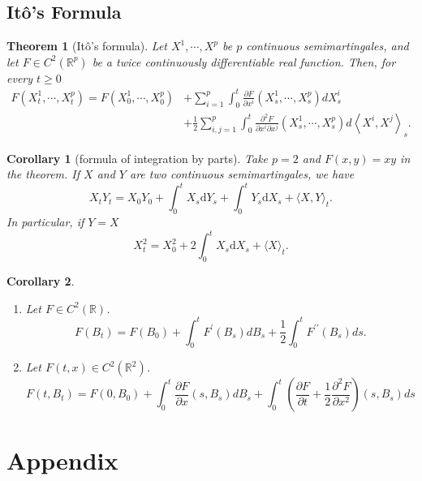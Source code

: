 \documentclass{report}
\newtheorem{corollary}{Corollary}[section]
\newtheorem{theorem}{Theorem}[section]
\theoremstyle{nonumberplain}
\begin{document}
\section{Itô's Formula}
\begin{theorem}[Itô's formula]
	Let $X^{1}, \cdots, X^{p}$ be $p$ continuous semimartingales, and let $F\in C^2(\mathbb{R}^{p})$ be a twice continuously differentiable real function. Then, for every $t \geq 0$
	\[
	\begin{aligned}
	F\left(X_{t}^{1}, \cdots, X_{t}^{p}\right)=F\left(X_{0}^{1}, \cdots, X_{0}^{p}\right) &+\sum_{i=1}^{p} \int_{0}^{t} \frac{\partial F}{\partial x^{i}}\left(X_{s}^{1}, \cdots, X_{s}^{p}\right) d X_{s}^{i} \\
	&+\frac{1}{2} \sum_{i, j=1}^{p} \int_{0}^{t} \frac{\partial^{2} F}{\partial x^{i} \partial x^{j}}\left(X_{s}^{1}, \cdots, X_{s}^{p}\right) d\left\langle X^{i}, X^{j}\right\rangle_{s}.
	\end{aligned}
	\]
\end{theorem}

\begin{corollary}[formula of integration by parts]
	Take $p=2$ and $F(x, y)=x y$ in the theorem. If $X$ and $Y$ are two continuous semimartingales, we have
	\[
	X_{t} Y_{t}=X_{0} Y_{0}+\int_{0}^{t} X_{s} \mathrm{d} Y_{s}+\int_{0}^{t} Y_{s} \mathrm{d} X_{s}+\langle X, Y\rangle_{t}.
	\]
	In particular, if $Y=X$
	\[
	X_{t}^{2}=X_{0}^{2}+2 \int_{0}^{t} X_{s} \mathrm{d} X_{s}+\langle X\rangle_{t}.
	\]
\end{corollary}

\begin{corollary}
	\begin{enumerate}
		\item Let $F\in C^2(\mathbb{R})$.
		$$F\left(B_{t}\right)=F\left(B_{0}\right)+\int_{0}^{t} F^{\prime}\left(B_{s}\right) d B_{s}+\frac{1}{2} \int_{0}^{t} F^{\prime \prime}\left(B_{s}\right) d s.$$
		\item Let $F(t,x)\in C^2(\mathbb{R}^2)$.
		\[
		F\left(t, B_{t}\right)=F\left(0, B_{0}\right)+\int_{0}^{t} \frac{\partial F}{\partial x}\left(s, B_{s}\right) d B_{s}+\int_{0}^{t}\left(\frac{\partial F}{\partial t}+\frac{1}{2} \frac{\partial^{2} F}{\partial x^{2}}\right)\left(s, B_{s}\right) d s
		\]
	\end{enumerate}
	
	
\end{corollary}


\newpage

\chapter*{Appendix}
\end{document}
